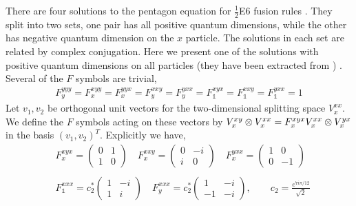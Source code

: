 There are four solutions to the pentagon equation for $\frac{1}{2}$E6 fusion rules \cite{Hagge2007}.
They split into two sets, one pair has all positive quantum dimensions, while the other has negative quantum dimension on the $x$ particle. 
The solutions in each set are related by complex conjugation. 
Here we present one of the solutions with positive quantum dimensions on all particles (they have been extracted from \cite{Wakui2002}) . 
Several of the $F$ symbols are trivial,
\begin{align}
F^{yyy}_y = F^{xyy}_x = F^{yyx}_x = F^{xxy}_y  = F^{yxx}_y = F^{xyx}_{\mathds{1}} = F^{xxy}_{\mathds{1}} = F^{yxx}_{\mathds{1}}= 1
\end{align}
Let $v_1, v_2$ be orthogonal unit vectors for the two-dimensional splitting space $V^{xx}_x$. 
We define the $F$ symbols acting on these vectors by $V^{xy}_x \otimes V^{xx}_x  = F^{xyx}_x V^{xx}_x \otimes V^{yx}_x$ in the basis $(v_1, v_2)^{T}$.
Explicitly we have,
\begin{align}
&F^{xyx}_x = \left(\begin{matrix}
0&1\\
1&0
\end{matrix} \right) \quad
F^{xxy}_x = \left(\begin{matrix}
0&-i\\
i&0
\end{matrix} \right) \quad
F^{yxx}_x = \left(\begin{matrix}
1&0\\
0&-1
\end{matrix} \right) 
\\
\\
&F^{xxx}_{\mathds{1}} = c_2^* \left(\begin{matrix}
1&-i\\
1&i
\end{matrix} \right) \quad
F^{xxx}_y = c_2^*\left(\begin{matrix}
1&-i\\
-1&-i
\end{matrix} \right), \quad \quad c_2  = \frac{e^{7 i \pi/12}}{\sqrt{2}}
\end{align}

